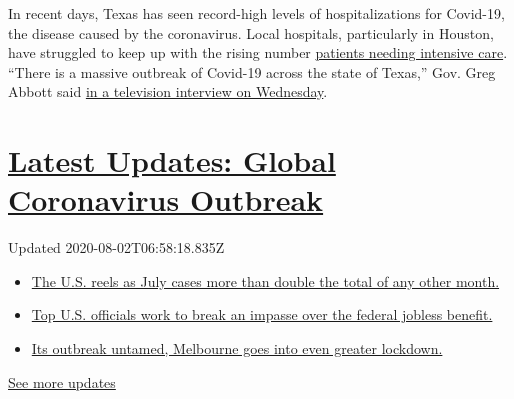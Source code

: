 In recent days, Texas has seen record-high levels of hospitalizations
for Covid-19, the disease caused by the coronavirus. Local hospitals,
particularly in Houston, have struggled to keep up with the rising
number
\href{https://www.texastribune.org/2020/06/23/texas-coronavirus-hospitalizations-icu-houston/}{patients
needing intensive care}. ``There is a massive outbreak of Covid-19
across the state of Texas,'' Gov. Greg Abbott said
\href{https://dfw.cbslocal.com/2020/06/24/gov-greg-abbott-says-texas-massive-covid-19-outbreak}{in
a television interview on Wednesday}.

\hypertarget{latest-updates-global-coronavirus-outbreak}{%
\section{\texorpdfstring{\href{https://www.nytimes.com/2020/08/01/world/coronavirus-covid-19.html?action=click\&pgtype=Article\&state=default\&region=MAIN_CONTENT_1\&context=storylines_live_updates}{Latest
Updates: Global Coronavirus
Outbreak}}{Latest Updates: Global Coronavirus Outbreak}}\label{latest-updates-global-coronavirus-outbreak}}

Updated 2020-08-02T06:58:18.835Z

\begin{itemize}
\tightlist
\item
  \href{https://www.nytimes.com/2020/08/01/world/coronavirus-covid-19.html?action=click\&pgtype=Article\&state=default\&region=MAIN_CONTENT_1\&context=storylines_live_updates\#link-34047410}{The
  U.S. reels as July cases more than double the total of any other
  month.}
\item
  \href{https://www.nytimes.com/2020/08/01/world/coronavirus-covid-19.html?action=click\&pgtype=Article\&state=default\&region=MAIN_CONTENT_1\&context=storylines_live_updates\#link-780ec966}{Top
  U.S. officials work to break an impasse over the federal jobless
  benefit.}
\item
  \href{https://www.nytimes.com/2020/08/01/world/coronavirus-covid-19.html?action=click\&pgtype=Article\&state=default\&region=MAIN_CONTENT_1\&context=storylines_live_updates\#link-2bc8948}{Its
  outbreak untamed, Melbourne goes into even greater lockdown.}
\end{itemize}

\href{https://www.nytimes.com/2020/08/01/world/coronavirus-covid-19.html?action=click\&pgtype=Article\&state=default\&region=MAIN_CONTENT_1\&context=storylines_live_updates}{See
more updates}

